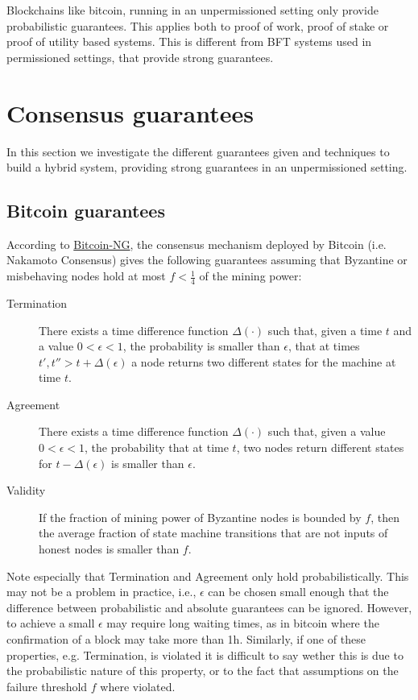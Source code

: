 


\noindent
Blockchains like bitcoin, running in an unpermissioned setting only provide probabilistic guarantees. This applies both to proof of work, proof of stake or proof of utility based systems. This is different from BFT systems used in permissioned settings, that provide strong guarantees. 

\section{Consensus guarantees}
In this section we investigate the different guarantees given and techniques to build a hybrid system, providing strong guarantees in an unpermissioned setting.

\subsection{Bitcoin guarantees}
According to \href{https://www.usenix.org/system/files/conference/nsdi16/nsdi16-paper-eyal.pdf}{Bitcoin-NG}, the consensus mechanism deployed by Bitcoin (i.e. Nakamoto Consensus) gives the following guarantees assuming that Byzantine or misbehaving nodes hold at most $f<\frac{1}{4}$ of the mining power:

\begin{description}
	\item[Termination] There exists a time difference function $\Delta(\cdot)$ such that, given a time $t$ and a value $0<\epsilon<1$, the probability is smaller than $\epsilon$, that at times $t',t''>t+\Delta(\epsilon)$ a node returns two different states for the machine at time $t$.
	\item[Agreement] There exists a time difference function $\Delta(\cdot)$ such that, given a value $0<\epsilon<1$, the probability that at time $t$, two nodes return different states for $t-\Delta(\epsilon)$ is smaller than $\epsilon$.
	\item[Validity] If the fraction of mining power of Byzantine nodes is bounded by $f$, then the average fraction of state machine transitions that are not inputs of honest nodes is smaller than $f$.
\end{description}

Note especially that Termination and Agreement only hold probabilistically. 
This may not be a problem in practice, i.e., $\epsilon$ can be chosen small enough that the difference between probabilistic and absolute guarantees can be ignored. 
However, to achieve a small $\epsilon$ may require long waiting times, as in bitcoin where the confirmation of a block may take more than 1h.
Similarly, if one of these properties, e.g. Termination, is violated it is difficult to say wether this is due to the probabilistic nature of this property, or to the fact that assumptions on the failure threshold $f$ where violated.

